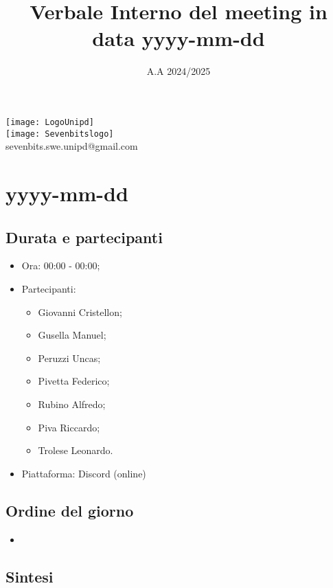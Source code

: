 \documentclass[10pt]{article}
\title{Verbale Interno del meeting in data yyyy-mm-dd} %
\date{A.A 2024/2025}
\begin{document}
\maketitle
\center 
\texttt{[image: LogoUnipd]}\\
\texttt{[image: Sevenbitslogo]}\\
sevenbits.swe.unipd@gmail.com\\
\vspace{2mm}

\newpage
\raggedright
\tableofcontents
\newpage

\section{yyyy-mm-dd} %
\subsection{Durata e partecipanti}
\begin{itemize}
\item Ora: 00:00 - 00:00; %
\item Partecipanti: 	
        \begin{itemize}
            \item Giovanni Cristellon;
            \item Gusella Manuel;
            \item Peruzzi Uncas;
            \item Pivetta Federico;
            \item Rubino Alfredo;
            \item Piva Riccardo;
            \item Trolese Leonardo.
        \end{itemize}
\item Piattaforma: Discord (online)
\end{itemize}

\subsection{Ordine del giorno}
\begin{itemize}
    \item 
\end{itemize}

\subsection{Sintesi}
\end{document}

